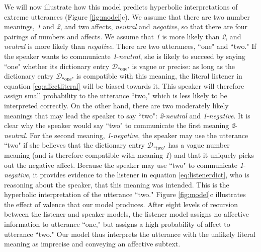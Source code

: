 \documentclass{article} %
\newcommand{\dictionary}{\ensuremath{\mathcal{D}}\xspace}
\begin{document}
We will now illustrate how this model predicts hyperbolic interpretations of extreme utterances (Figure \ref{fig:model}c). We assume that there are two number meanings, \emph{1} and \emph{2}, and two affects, \emph{neutral} and \emph{negative}, so that there are four pairings of numbers and affects. We assume that \emph{1} is more likely than \emph{2}, and \emph{neutral} is more likely than \emph{negative}. There are two utterances, ``one" and ``two." If the speaker wants to communicate \emph{1}-\emph{neutral}, she is likely to succeed by saying ``one" whether its dictionary entry $\dictionary_{\text{``one"}}$ is vague or precise: as long as the dictionary entry $\dictionary_{\text{``one"}}$ is compatible with this meaning, the literal listener in equation \ref{eq:affectliteral} will be biased towards it. This speaker will therefore assign small probability to the utterance ``two," which is less likely to be interpreted correctly. On the other hand, there are two moderately likely meanings that may lead the speaker to say ``two": \emph{2}-\emph{neutral} and \emph{1}-\emph{negative}. It is clear why the speaker would say ``two" to communicate the first meaning \emph{2}-\emph{neutral}. For the second meaning, \emph{1}-\emph{negative}, the speaker may use the utterance ``two" if she believes that the dictionary entry  $\dictionary_{\text{``two"}}$ has a vague number meaning (and is therefore compatible with meaning \emph{1}) and that it uniquely picks out the negative affect. Because the speaker may use ``two" to communicate \emph{1}-\emph{negative}, it provides evidence to the listener in equation \ref{eq:listenerdict}, who is reasoning about the speaker, that this meaning was intended. This is the hyperbolic interpretation of the utterance ``two." Figure \ref{fig:model}c illustrates the effect of valence that our model produces. After eight levels of recursion between the listener and speaker models, the listener model assigns no affective information to utterance ``one," but assigns a high probability of affect to utterance ``two." Our model thus interprets the utterance with the unlikely literal meaning as imprecise and conveying an affective subtext.

\end{document}
